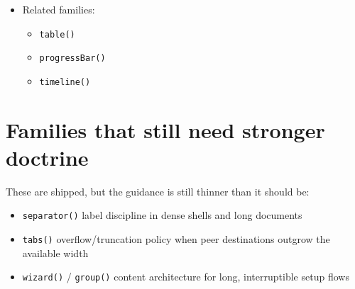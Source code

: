 \begin{itemize}
  \begin{itemize}
  \tightlist
  \item
    rich: Unicode block or Braille glyphs with semantic color tokens
  \item
    static: same glyph rendering without animation
  \item
    pipe: numeric summary (min/max/mean) or CSV-style output
  \item
    accessible: spoken trend summary (e.g.~``rising from 2 to 8 over 10 samples'')
  \end{itemize}
\item
  Related families:

  \begin{itemize}
  \tightlist
  \item
    \texttt{t\allowbreak{}a\allowbreak{}b\allowbreak{}l\allowbreak{}e\allowbreak{}(\allowbreak{})}
  \item
    \texttt{p\allowbreak{}r\allowbreak{}o\allowbreak{}g\allowbreak{}r\allowbreak{}e\allowbreak{}s\allowbreak{}s\allowbreak{}B\allowbreak{}a\allowbreak{}r\allowbreak{}(\allowbreak{})}
  \item
    \texttt{t\allowbreak{}i\allowbreak{}m\allowbreak{}e\allowbreak{}l\allowbreak{}i\allowbreak{}n\allowbreak{}e\allowbreak{}(\allowbreak{})}
  \end{itemize}
\end{itemize}

\section{Families that still need stronger doctrine}\label{record-019-families-that-still-need-stronger-doctrine}

These are shipped, but the guidance is still thinner than it should be:

\begin{itemize}
\tightlist
\item
  \texttt{s\allowbreak{}e\allowbreak{}p\allowbreak{}a\allowbreak{}r\allowbreak{}a\allowbreak{}t\allowbreak{}o\allowbreak{}r\allowbreak{}(\allowbreak{})} label discipline in dense shells and long documents
\item
  \texttt{t\allowbreak{}a\allowbreak{}b\allowbreak{}s\allowbreak{}(\allowbreak{})} overflow/truncation policy when peer destinations outgrow the available width
\item
  \texttt{w\allowbreak{}i\allowbreak{}z\allowbreak{}a\allowbreak{}r\allowbreak{}d\allowbreak{}(\allowbreak{})} / \texttt{g\allowbreak{}r\allowbreak{}o\allowbreak{}u\allowbreak{}p\allowbreak{}(\allowbreak{})} content architecture for long, interruptible setup flows
\end{itemize}

